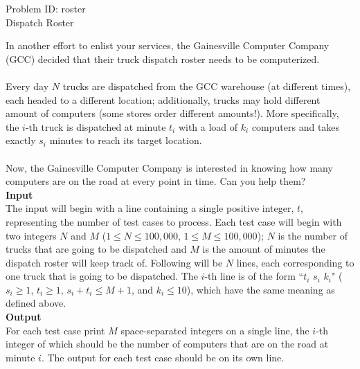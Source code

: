 \documentclass[a4paper,11pt]{article}
\begin{document}
\begin{center}
{\Huge Problem ID: roster}\vspace{2 mm} \\	%
{\huge Dispatch Roster}\vspace{2 mm} \\	%
\end{center}
\setcounter{page}{14}
\large{
In another effort to enlist your services, the Gainesville Computer Company (GCC) decided that their truck dispatch roster needs to be computerized.\\\\
Every day $N$ trucks are dispatched from the GCC warehouse (at different times), each headed to a different location; additionally, trucks may hold different amount of computers (some stores order different amounts!). More specifically, the $i$-th truck is dispatched at minute $t_i$ with a load of $k_i$ computers and takes exactly $s_i$ minutes to reach its target location.\\\\
Now, the Gainesville Computer Company is interested in knowing how many computers are on the road at every point in time. Can you help them?
}
\vspace{7mm}\\
\large{\bf{Input}}\vspace{2mm}\\
The input will begin with a line containing a single positive integer, $t$, representing the number of test cases to process. Each test case will begin with two integers $N$ and $M$ ($1 \leq N \leq 100,000$, $1 \leq M \leq 100,000$); $N$ is the number of trucks that are going to be dispatched and $M$ is the amount of minutes the dispatch roster will keep track of. Following will be $N$ lines, each corresponding to one truck that is going to be dispatched. The $i$-th line is of the form ``$t_i$ $s_i$ $k_i$" ($s_i \geq 1$, $t_i \geq 1$, $s_i+t_i \leq M+1$, and $k_i \leq 10$), which have the same meaning as defined above.
\vspace{3mm}\\
\large{\bf{Output}}\vspace{2mm}\\
For each test case print $M$ space-separated integers on a single line, the $i$-th integer of which should be the number of computers that are on the road at minute $i$. The output for each test case should be on its own line.
\vspace{5mm}\\
\end{document}
